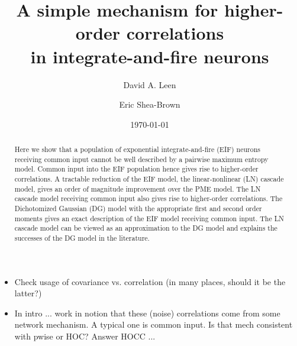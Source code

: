 \documentclass[%
 reprint,
 twocolumn,
 amsmath,amssymb,
 aps,
floatfix,
]{revtex4}
\begin{document}

\title{A simple mechanism for higher-order correlations\\ in integrate-and-fire neurons}%

\author{David A. Leen}

 
\author{Eric Shea-Brown}%

\date{\today}%

\begin{abstract}
Here we show that a population of exponential integrate-and-fire (EIF) neurons receiving common input cannot be well described by a pairwise maximum entropy model. Common input into the EIF population hence gives rise to higher-order correlations. A tractable reduction of the EIF model, the linear-nonlinear (LN) cascade model, gives an order of magnitude improvement over the PME model. The LN cascade model receiving common input also gives rise to higher-order correlations. The Dichotomized Gaussian (DG) model with the appropriate first and second order moments gives an exact description of the EIF model receiving common input. The LN cascade model can be viewed as an approximation to the DG model and explains the successes of the DG model in the literature.
\end{abstract}

\maketitle

\begin{itemize}
\item Check usage of covariance vs. correlation (in many places, should it be the latter?)
\item In intro ... work in notion that these (noise) correlations come from some network mechanism.  A typical one is common input.  Is that mech consistent with pwise or HOC?  Answer HOCC ... 
\end{itemize}
\end{document}
